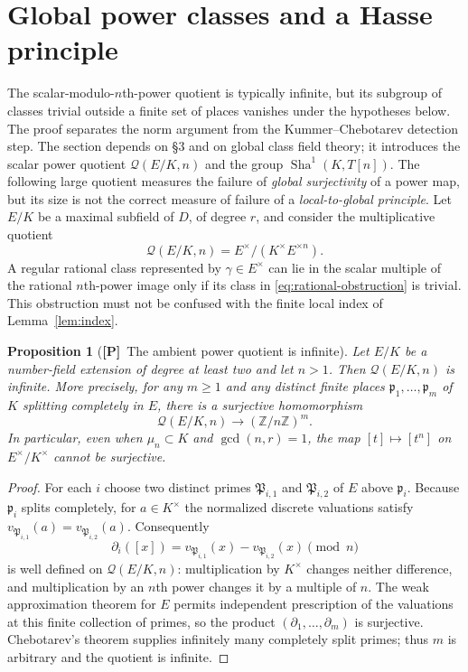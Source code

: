 \documentclass[11pt]{article}
\newcommand{\Sha}{\operatorname{Sha}}
\newcommand{\Ptag}{\textnormal{\textbf{[P]}}}
\theoremstyle{plain}
\newtheorem{proposition}[theorem]{Proposition}
\theoremstyle{definition}
\begin{document}
\section{Global power classes and a Hasse principle}\label{sec:global-power}
The scalar-modulo-$n$th-power quotient is typically infinite,
but its subgroup of classes trivial outside a finite set of places
vanishes under the hypotheses below. The proof separates the
norm argument from the Kummer--Chebotarev detection step. The section depends on \S3 and on global class field theory; it introduces the scalar power quotient $\mathcal Q(E/K,n)$ and the group $\Sha^1(K,T[n])$.
The following large quotient measures the failure of \emph{global
surjectivity} of a power map, but its size is not the correct measure
of failure of a \emph{local-to-global principle}. Let $E/K$ be a maximal subfield
of $D$, of degree $r$, and consider the multiplicative quotient
\begin{equation}\label{eq:rational-obstruction}
\mathcal Q(E/K,n)=E^\times/(K^\times E^{\times n}).
\end{equation}
A regular rational class represented by $\gamma\in E^\times$
can lie in the scalar multiple of the rational $n$th-power image
only if its class in \eqref{eq:rational-obstruction} is trivial.
This obstruction must not be confused with the finite local index
of Lemma~\ref{lem:index}.

\begin{proposition}[\Ptag\ The ambient power quotient is infinite]
\label{prop:global-cokernel}
Let $E/K$ be a number-field extension of degree at least two and
let $n>1$. Then $\mathcal Q(E/K,n)$ is infinite. More precisely,
for any $m\geq 1$ and any distinct finite places
$\mathfrak p_1,\dots,\mathfrak p_m$ of $K$ splitting completely in
$E$, there is a surjective homomorphism
\[
\mathcal Q(E/K,n)\longrightarrow (\mathbb Z/n\mathbb Z)^m.
\]
In particular, even when $\mu_n\subset K$ and $\gcd(n,r)=1$,
the map $[t]\mapsto[t^n]$ on $E^\times/K^\times$ cannot be
surjective.
\end{proposition}
\begin{proof}
For each $i$ choose two distinct primes
$\mathfrak P_{i,1}$ and $\mathfrak P_{i,2}$ of $E$ above
$\mathfrak p_i$. Because $\mathfrak p_i$ splits completely,
for $a\in K^\times$ the normalized discrete valuations satisfy
$v_{\mathfrak P_{i,1}}(a)=v_{\mathfrak P_{i,2}}(a)$.
Consequently
\[
\partial_i([x])=
 v_{\mathfrak P_{i,1}}(x)-v_{\mathfrak P_{i,2}}(x)
 \pmod n
\]
is well defined on $\mathcal Q(E/K,n)$: multiplication by
$K^\times$ changes neither difference, and multiplication by
an $n$th power changes it by a multiple of $n$.
The weak approximation theorem for $E$ permits independent
prescription of the valuations at this finite collection of primes,
so the product $(\partial_1,\dots,\partial_m)$ is surjective.
Chebotarev's theorem supplies infinitely many completely split
primes; thus $m$ is arbitrary and the quotient is infinite.
\end{proof}
\end{document}
